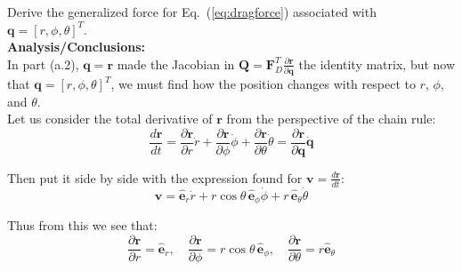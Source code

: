 \documentclass[titlepage]{article}
\begin{document}
Derive the generalized force for Eq.~(\ref{eq:dragforce}) associated with $\boldsymbol{q}=[r,\phi,\theta]^T$.\\

\textbf{Analysis/Conclusions:}\\

In part (a.2), $\boldsymbol{q}=\boldsymbol{r}$ made the Jacobian in $\boldsymbol{Q}=\boldsymbol{F}_D^T\frac{\partial\boldsymbol{r}}{\partial\boldsymbol{q}}$ the identity matrix, but now that $\boldsymbol{q}=[r,\phi,\theta]^T$, we must find how the position changes with respect to $r$, $\phi$, and $\theta$.\\

Let us consider the total derivative of $\boldsymbol{r}$ from the perspective of the chain rule:
\begin{equation}
	\frac{d\boldsymbol{r}}{dt}=\frac{\partial\boldsymbol{r}}{\partial r}\dot{r}+\frac{\partial\boldsymbol{r}}{\partial\phi}\dot{\phi}+\frac{\partial\boldsymbol{r}}{\partial\theta}\dot{\theta}=\frac{\partial\boldsymbol{r}}{\partial\boldsymbol{q}}\dot{\boldsymbol{q}}
\end{equation}

Then put it side by side with the expression found for $\boldsymbol{v}=\frac{d\boldsymbol{r}}{dt}$:
\begin{equation}
	\boldsymbol{v}=\hat{\boldsymbol{e}}_r\dot{r}+r\cos\theta\,\hat{\boldsymbol{e}}_\phi\dot{\phi}+r\,\hat{\boldsymbol{e}}_\theta\dot{\theta}
\end{equation}

Thus from this we see that:
\begin{equation}
	\frac{\partial\boldsymbol{r}}{\partial r}=\hat{\boldsymbol{e}}_r,\quad\frac{\partial\boldsymbol{r}}{\partial\phi}=r\cos\theta\,\hat{\boldsymbol{e}}_\phi,\quad\frac{\partial\boldsymbol{r}}{\partial\theta}=r\hat{\boldsymbol{e}}_\theta
\end{equation}
\end{document}
